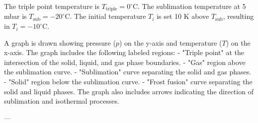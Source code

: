 The triple point temperature is \( T_{\text{triple}} = 0^\circ\text{C} \).  
The sublimation temperature at 5 mbar is \( T_{\text{sub}} = -20^\circ\text{C} \).  
The initial temperature \( T_i \) is set 10 K above \( T_{\text{sub}} \), resulting in \( T_i = -10^\circ\text{C} \).  

A graph is drawn showing pressure (\( p \)) on the y-axis and temperature (\( T \)) on the x-axis. The graph includes the following labeled regions:  
- "Triple point" at the intersection of the solid, liquid, and gas phase boundaries.  
- "Gas" region above the sublimation curve.  
- "Sublimation" curve separating the solid and gas phases.  
- "Solid" region below the sublimation curve.  
- "Frost fusion" curve separating the solid and liquid phases.  
The graph also includes arrows indicating the direction of sublimation and isothermal processes.

---